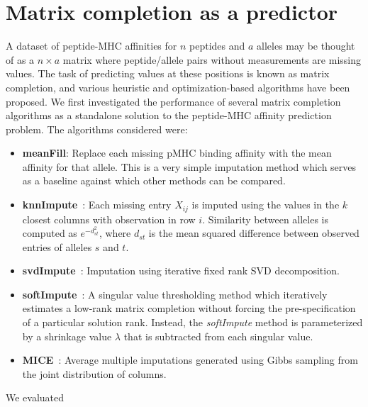 \section*{Matrix completion as a predictor}

A dataset of peptide-MHC affinities for $n$ peptides and $a$ alleles may be thought of as a $n \times a$ matrix where peptide/allele pairs without measurements are missing values. The task of predicting values at these positions is known as matrix completion, and various heuristic and optimization-based algorithms have been proposed. We first investigated the performance of several matrix completion algorithms as a standalone solution to the peptide-MHC affinity prediction problem. The algorithms considered were:


\begin{itemize}
\item {\bf meanFill}: Replace each missing pMHC binding affinity with the mean affinity for that allele. This is a very simple imputation method which serves as a baseline against which other methods can be compared. 

\item {\bf knnImpute}~\cite{Troyanskaya_2001}: Each missing entry $X_{ij}$ is imputed using the values in the $k$ closest columns with observation in row $i$.  Similarity between alleles is computed as $e^{-d_{st}^2}$, where $d_{st}$ is the mean squared difference between observed entries of alleles $s$ and $t$. 

\item {\bf svdImpute}~\cite{Troyanskaya_2001}: Imputation using iterative fixed rank SVD decomposition. 

\item {\bf softImpute}~\cite{Mazumder2010SpectralMatrices}: A singular value thresholding method which iteratively estimates a low-rank matrix completion without forcing the pre-specification of a particular solution rank. Instead, the {\it softImpute} method is parameterized by a shrinkage value $\lambda$ that is subtracted from each singular value. 

\item {\bf MICE}~\cite{Azur_2011}: Average multiple imputations generated using Gibbs sampling from the joint distribution of columns. 
\end{itemize}

We evaluated 


